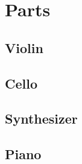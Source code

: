 \section{Parts}
\begin{center}
\fancyhf{} %
\renewcommand{\headrulewidth}{0pt} %
\rfoot{\thepage}
\pagestyle{plain}

\pagebreak

\subsection{Violin}
\begin{center}
 
\end{center}

\pagebreak

\subsection{Cello}
\begin{center}
 
\end{center}

\pagebreak

\subsection{Synthesizer}
\begin{center}
 
\end{center}

\pagebreak

\subsection{Piano}
\begin{center}
 
\pagebreak
\end{center}


\end{center}




